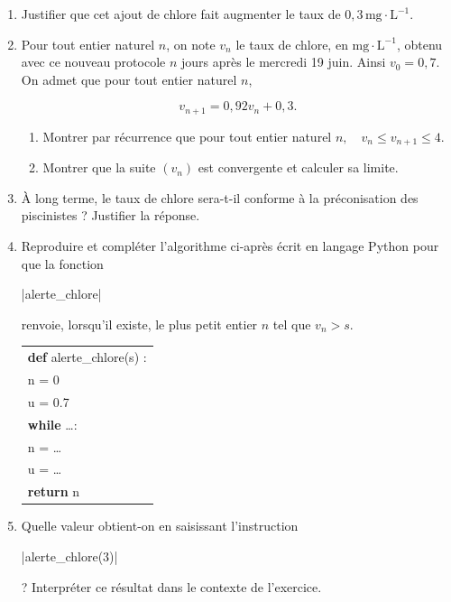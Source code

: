 \begin{enumerate}
	\item Justifier que cet ajout de chlore fait augmenter le taux de $0,3\, \mathrm{mg \cdot L}^{-1}$.

	\item Pour tout entier naturel $n$, on note $v_{n}$ le taux de chlore, en $\mathrm{mg \cdot L}^{-1}$, obtenu avec ce nouveau protocole $n$ jours après le mercredi 19 juin. Ainsi $v_{0}=0,7$.\\
	On admet que pour tout entier naturel $n$, 
	
	\[v_{n+1}=0,92 v_{n}+ 0,3.\]
	\begin{enumerate}
		\item  Montrer par récurrence que pour tout entier naturel $n, \quad v_{n} \leqslant v_{n+1} \leqslant 4$.
		\item Montrer que la suite $\left(v_{n}\right)$ est convergente et calculer sa limite.
	\end{enumerate}

	\item À long terme, le taux de chlore sera-t-il conforme à la préconisation des piscinistes ? Justifier la réponse.

	\item Reproduire et compléter l'algorithme ci-après écrit en langage Python pour que la fonction {\begin{Verb}|alerte_chlore|\end{Verb}} renvoie, lorsqu'il existe, le plus petit entier $n$ tel que $v_{n}> s$.

	\begin{center}
	\begin{tabular}{|l|}\hline
		\textbf{def} alerte\_chlore(s) :\\
		\qquad n = 0\\
		\qquad u = 0.7\\
		\qquad \textbf{while} \ldots :\\
		\qquad \qquad n = \ldots \\
		\qquad \qquad u = \ldots\\
		\qquad \textbf{return} n\\ \hline
	\end{tabular}
\end{center}

	\item Quelle valeur obtient-on en saisissant l'instruction {\begin{Verb}|alerte_chlore(3)|\end{Verb}} ? Interpréter ce résultat dans le contexte de l'exercice.
\end{enumerate}

